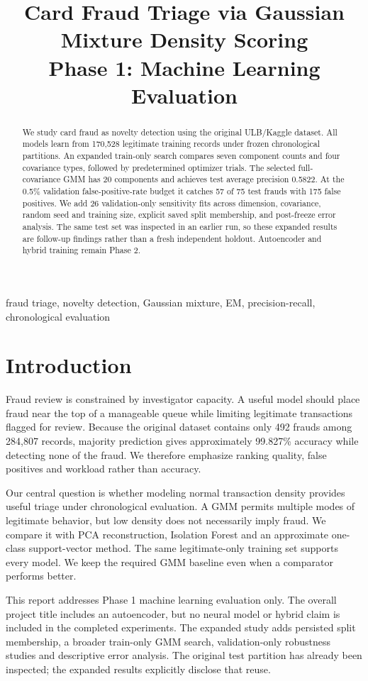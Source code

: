\documentclass[conference]{IEEEtran}
\title{Card Fraud Triage via Gaussian Mixture Density Scoring\\Phase 1: Machine Learning Evaluation}
\author{\IEEEauthorblockN{Team T085}\IEEEauthorblockA{Section E, Project 26\\Rishihood University}}
\begin{document}
\maketitle
\begin{abstract}
We study card fraud as novelty detection using the original ULB/Kaggle dataset. All models learn from 170,528 legitimate training records under frozen chronological partitions. An expanded train-only search compares seven component counts and four covariance types, followed by predetermined optimizer trials. The selected full-covariance GMM has 20 components and achieves test average precision 0.5822. At the 0.5\% validation false-positive-rate budget it catches 57 of 75 test frauds with 175 false positives. We add 26 validation-only sensitivity fits across dimension, covariance, random seed and training size, explicit saved split membership, and post-freeze error analysis. The same test set was inspected in an earlier run, so these expanded results are follow-up findings rather than a fresh independent holdout. Autoencoder and hybrid training remain Phase 2.
\end{abstract}
\begin{IEEEkeywords}
fraud triage, novelty detection, Gaussian mixture, EM, precision-recall, chronological evaluation
\end{IEEEkeywords}

\section{Introduction}
Fraud review is constrained by investigator capacity. A useful model should place fraud near the top of a manageable queue while limiting legitimate transactions flagged for review. Because the original dataset contains only 492 frauds among 284,807 records, majority prediction gives approximately 99.827\% accuracy while detecting none of the fraud. We therefore emphasize ranking quality, false positives and workload rather than accuracy.

Our central question is whether modeling normal transaction density provides useful triage under chronological evaluation. A GMM permits multiple modes of legitimate behavior, but low density does not necessarily imply fraud. We compare it with PCA reconstruction, Isolation Forest and an approximate one-class support-vector method. The same legitimate-only training set supports every model. We keep the required GMM baseline even when a comparator performs better.

This report addresses Phase 1 machine learning evaluation only. The overall project title includes an autoencoder, but no neural model or hybrid claim is included in the completed experiments. The expanded study adds persisted split membership, a broader train-only GMM search, validation-only robustness studies and descriptive error analysis. The original test partition has already been inspected; the expanded results explicitly disclose that reuse.
\end{document}
